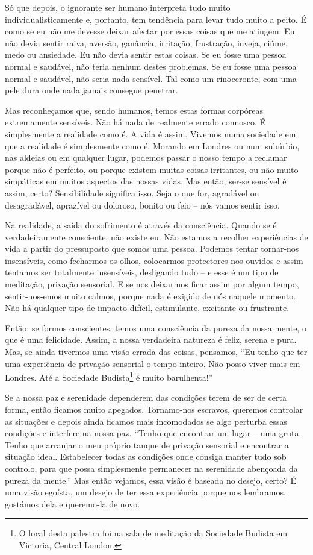 Só que depois, o ignorante ser humano interpreta tudo muito
individualisticamente e, portanto, tem tendência para levar tudo muito a peito.
É como se eu não me devesse deixar afectar por essas coisas que me atingem. Eu
não devia sentir raiva, aversão, ganância, irritação, frustração, inveja, ciúme,
medo ou ansiedade. Eu não devia sentir estas coisas. Se eu fosse uma pessoa
normal e saudável, não teria nenhum destes problemas. Se eu fosse uma pessoa
normal e saudável, não seria nada sensível. Tal como um rinoceronte, com uma
pele dura onde nada jamais consegue penetrar.

Mas reconheçamos que, sendo humanos, temos estas formas corpóreas extremamente
sensíveis. Não há nada de realmente errado connosco. É simplesmente a realidade
como é. A vida é assim. Vivemos numa sociedade em que a realidade é simplesmente
como é. Morando em Londres ou num subúrbio, nas aldeias ou em qualquer lugar,
podemos passar o nosso tempo a reclamar porque não é perfeito, ou porque existem
muitas coisas irritantes, ou não muito simpáticas em muitos aspectos das nossas
vidas. Mas então, ser-se sensível é assim, certo? Sensibilidade significa isso.
Seja o que for, agradável ou desagradável, aprazível ou doloroso, bonito ou feio
-- nós vamos sentir isso.

Na realidade, a saída do sofrimento é através da consciência. Quando se é
verdadeiramente consciente, não existe eu. Não estamos a recolher experiências
de vida a partir do pressuposto que somos uma pessoa. Podemos tentar tornar-nos
insensíveis, como fecharmos os olhos, colocarmos protectores nos ouvidos e assim
tentamos ser totalmente insensíveis, desligando tudo -- e esse é um tipo de
meditação, privação sensorial. E se nos deixarmos ficar assim por algum tempo,
sentir-nos-emos muito calmos, porque nada é exigido de nós naquele momento. Não
há qualquer tipo de impacto difícil, estimulante, excitante ou frustrante.

Então, se formos conscientes, temos uma consciência da pureza da nossa mente, o
que é uma felicidade. Assim, a nossa verdadeira natureza é feliz, serena e pura.
Mas, se ainda tivermos uma visão errada das coisas, pensamos, ``Eu tenho que ter
uma experiência de privação sensorial o tempo inteiro. Não posso viver mais em
Londres. Até a Sociedade Budista\footnote{O local desta palestra foi na sala de
  meditação da Sociedade Budista em Victoria, Central London.} é muito
barulhenta!''

Se a nossa paz e serenidade dependerem das condições terem de ser de certa
forma, então ficamos muito apegados. Tornamo-nos escravos, queremos controlar as
situações e depois ainda ficamos mais incomodados se algo perturba essas
condições e interfere na nossa paz. ``Tenho que encontrar um lugar -- uma gruta.
Tenho que arranjar o meu próprio tanque de privação sensorial e encontrar a
situação ideal. Estabelecer todas as condições onde consiga manter tudo sob
controlo, para que possa simplesmente permanecer na serenidade abençoada da
pureza da mente.'' Mas então vejamos, essa visão é baseada no desejo, certo? É
uma visão egoísta, um desejo de ter essa experiência porque nos lembramos,
gostámos dela e queremo-la de novo.

